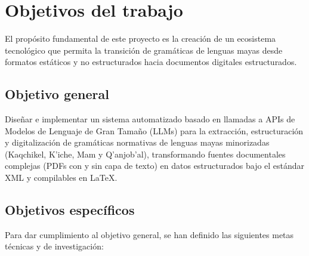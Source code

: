 
\chapter{Objetivos del trabajo}

El propósito fundamental de este proyecto es la creación de un ecosistema tecnológico que permita la transición de gramáticas de lenguas mayas desde formatos estáticos y no estructurados hacia documentos digitales estructurados.

\section{Objetivo general}

Diseñar e implementar un sistema automatizado basado en llamadas a APIs de Modelos de Lenguaje de Gran Tamaño (LLMs) para la extracción, estructuración y digitalización de gramáticas normativas de lenguas mayas minorizadas (Kaqchikel, K'iche, Mam y Q’anjob’al), transformando fuentes documentales complejas (PDFs con y sin capa de texto) en datos estructurados bajo el estándar XML y compilables en \LaTeX{}.

\section{Objetivos específicos}

Para dar cumplimiento al objetivo general, se han definido las siguientes metas técnicas y de investigación:

